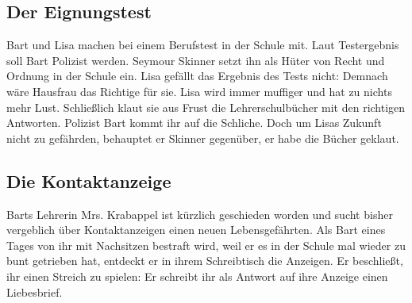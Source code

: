 \subsection{Der Eignungstest}\label{8F15}
Bart und Lisa machen bei einem Berufstest in der Schule mit. Laut Testergebnis soll Bart Polizist werden. Seymour Skinner setzt ihn als Hüter von Recht und Ordnung in der Schule ein. Lisa gefällt das Ergebnis des Tests nicht: Demnach wäre Hausfrau das Richtige für sie. Lisa wird immer muffiger und hat zu nichts mehr Lust. Schließlich klaut sie aus Frust die Lehrerschulbücher mit den richtigen Antworten. Polizist Bart kommt ihr auf die Schliche. Doch um Lisas Zukunft nicht zu gefährden, behauptet er Skinner gegenüber, er habe die Bücher geklaut.


	
\subsection{Die Kontaktanzeige}\label{8F16}
Barts Lehrerin Mrs. Krabappel ist kürzlich geschieden worden und sucht bisher vergeblich über Kontaktanzeigen einen neuen Lebensgefährten. Als Bart eines Tages von ihr mit Nachsitzen bestraft wird, weil er es in der Schule mal wieder zu bunt getrieben hat, entdeckt er in ihrem Schreibtisch die Anzeigen. Er beschließt, ihr einen Streich zu spielen: Er schreibt ihr als Antwort auf ihre Anzeige einen Liebesbrief.


